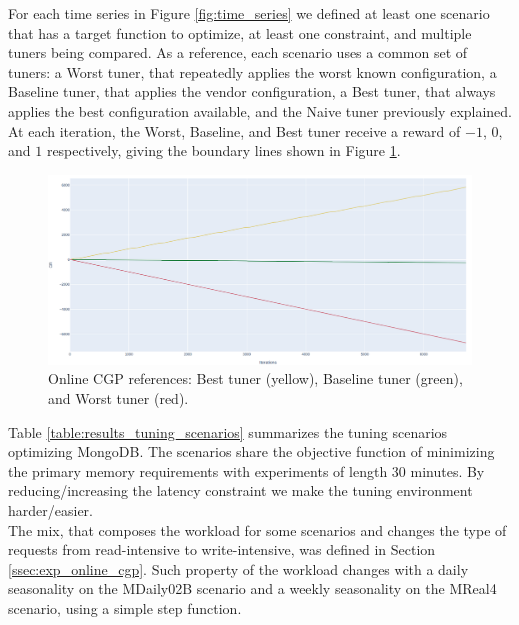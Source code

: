 \documentclass[a4paper, 12pt]{article} %
\begin{document}
	For each time series in Figure \ref{fig:time_series} we defined at least one scenario that has a target function to optimize, at least one constraint, and multiple tuners being compared. As a reference, each scenario uses a common set of tuners: a Worst tuner, that repeatedly applies the worst known configuration, a Baseline tuner, that applies the vendor configuration, a Best tuner, that always applies the best configuration available, and the Naive tuner previously explained.\\
	At each iteration, the Worst, Baseline, and Best tuner receive a reward of $-1$, $0$, and $1$ respectively, giving the boundary lines shown in Figure \ref{fig:results_onlinecgp_references}.
	
	\begin{figure} \centering
		\includegraphics[width=4.5in]{img/results_onlinecgp_references.png}
		\caption{Online CGP references: Best tuner (yellow), Baseline tuner (green), and Worst tuner (red).}
		\label{fig:results_onlinecgp_references}
	\end{figure}
	
	
	Table \ref{table:results_tuning_scenarios} summarizes the tuning scenarios optimizing MongoDB. The scenarios share the objective function of minimizing the primary memory requirements with experiments of length 30 minutes. By reducing/increasing the latency constraint we make the tuning environment harder/easier. \\
	The mix, that composes the workload for some scenarios and changes the type of requests from read-intensive to write-intensive, was defined in Section \ref{ssec:exp_online_cgp}.
	Such property of the workload changes with a daily seasonality on the MDaily02B scenario and a weekly seasonality on the MReal4 scenario, using a simple step function. 
\end{document}
